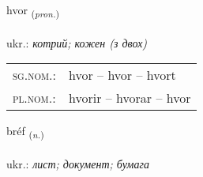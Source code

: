 \documentclass[frontgrid, backgrid]{flacards}\usepackage[]{graphicx}\usepackage[]{xcolor}
\begin{document}
\renewcommand{\blhead}{\vskip5pt {\small\bfseries\footnotesize Fornafn | займенник }}
\renewcommand{\bcfoot}{\vskip5pt \hspace{2pt}{\small\bfseries\footnotesize 1K}}


{hvor \small{\textsubscript{(\textit{pron.})}} \\[1ex] %
\textphonetic{[kʰvɔːr]} \\
ukr.: \emph{котрий; кожен (з двох)} \\  [2ex]
\renewcommand*{\arraystretch}{0.8}
\begin{tabular}{ll}
\textsc{sg.nom.}: & hvor  --  hvor -- hvort \\ 
\textsc{pl.nom.}: & hvorir -- hvorar -- hvor
\end{tabular}
}

\renewcommand{\flhead}{\vskip5pt \fboxsep=0pt {\small\bfseries\footnotesize Nafnorð | іменник}}
\renewcommand{\fcfoot}{\vskip5pt \fboxsep=0pt \hspace{2pt}{\small\bfseries\footnotesize 1K}}

\renewcommand{\blhead}{\vskip5pt {\small\bfseries\footnotesize Nafnorð | іменник }}
\renewcommand{\bcfoot}{\vskip5pt \hspace{2pt}{\small\bfseries\footnotesize 1K}}


{bréf \small{\textsubscript{(\textit{n.})}} \\[1ex] %
\textphonetic{[prjɛːv]} \\
ukr.: \emph{лист; документ; бумага} \\  [2ex]
\renewcommand*{\arraystretch}{0.8}
}

\renewcommand{\flhead}{\vskip5pt \fboxsep=0pt {\small\bfseries\footnotesize Sagnorð | дієслово}}
\renewcommand{\fcfoot}{\vskip5pt \fboxsep=0pt \hspace{2pt}{\small\bfseries\footnotesize 1K}}
\end{document}
